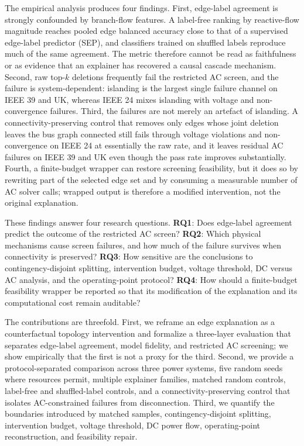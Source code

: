 The empirical analysis produces four findings. First, edge-label agreement is strongly confounded by branch-flow features. A label-free ranking by reactive-flow magnitude reaches pooled edge balanced accuracy close to that of a supervised edge-label predictor (SEP), and classifiers trained on shuffled labels reproduce much of the same agreement. The metric therefore cannot be read as faithfulness or as evidence that an explainer has recovered a causal cascade mechanism. Second, raw top-$k$ deletions frequently fail the restricted AC screen, and the failure is system-dependent: islanding is the largest single failure channel on IEEE 39 and UK, whereas IEEE 24 mixes islanding with voltage and non-convergence failures. Third, the failures are not merely an artefact of islanding. A connectivity-preserving control that removes only edges whose joint deletion leaves the bus graph connected still fails through voltage violations and non-convergence on IEEE 24 at essentially the raw rate, and it leaves residual AC failures on IEEE 39 and UK even though the pass rate improves substantially. Fourth, a finite-budget wrapper can restore screening feasibility, but it does so by rewriting part of the selected edge set and by consuming a measurable number of AC solver calls; wrapped output is therefore a modified intervention, not the original explanation.

These findings answer four research questions. \textbf{RQ1}: Does edge-label agreement predict the outcome of the restricted AC screen? \textbf{RQ2}: Which physical mechanisms cause screen failures, and how much of the failure survives when connectivity is preserved? \textbf{RQ3}: How sensitive are the conclusions to contingency-disjoint splitting, intervention budget, voltage threshold, DC versus AC analysis, and the operating-point protocol? \textbf{RQ4}: How should a finite-budget feasibility wrapper be reported so that its modification of the explanation and its computational cost remain auditable?

The contributions are threefold. First, we reframe an edge explanation as a counterfactual topology intervention and formalize a three-layer evaluation that separates edge-label agreement, model fidelity, and restricted AC screening; we show empirically that the first is not a proxy for the third. Second, we provide a protocol-separated comparison across three power systems, five random seeds where resources permit, multiple explainer families, matched random controls, label-free and shuffled-label controls, and a connectivity-preserving control that isolates AC-constrained failures from disconnection. Third, we quantify the boundaries introduced by matched samples, contingency-disjoint splitting, intervention budget, voltage threshold, DC power flow, operating-point reconstruction, and feasibility repair.

